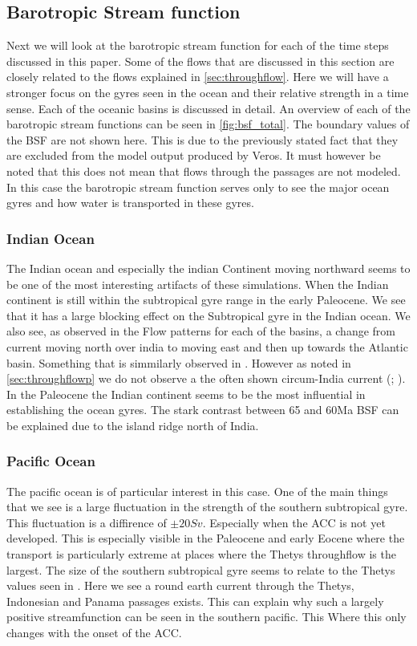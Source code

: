 \subsection{Barotropic Stream function}
\label{sec:BSF}

Next we will look at the barotropic stream function for each of the time steps discussed in this paper. Some of the flows that are discussed in this section are closely related to the flows explained in \cref{sec:throughflow}. Here we will have a stronger focus on the gyres seen in the ocean and their relative strength in a time sense. Each of the oceanic basins is discussed in detail. An overview of each of the barotropic stream functions can be seen in \cref{fig:bsf_total}. The boundary values of the BSF are not shown here. This is due to the previously stated fact that they are excluded from the model output produced by Veros. It must however be noted that this does not mean that flows through the passages are not modeled. In this case the barotropic stream function serves only to see the major ocean gyres and how water is transported in these gyres.

\subsubsection{Indian Ocean}
The Indian ocean and especially the indian Continent moving northward seems to be one of the most interesting artifacts of these simulations. When the Indian continent is still within the subtropical gyre range in the early Paleocene. We see that it has a large blocking effect on the Subtropical gyre in the Indian ocean. We also see, as observed in the Flow patterns for each of the basins, a change from current moving north over india to moving east and then up towards the Atlantic basin. Something that is simmilarly observed in \cite{omta2003physical}. However as noted in \cref{sec:throughflowp} we do not observe a the often shown circum-India current (\cite{omta2003physical};
\cite{von2006effect}). In the Paleocene the Indian continent seems to be the most influential in establishing the ocean gyres. The stark contrast between 65 and 60Ma BSF can be explained due to the island ridge north of India.
\subsubsection{Pacific Ocean}
The pacific ocean is of particular interest in this case. One of the main things that we see is a large fluctuation in the strength of the southern subtropical gyre. This fluctuation is a diffirence of $\pm 20 Sv$.  Especially when the ACC is not yet developed. This is especially visible in the Paleocene and early Eocene where the transport is particularly extreme at places where the Thetys throughflow is the largest. The size of the southern subtropical gyre seems to relate to the Thetys values seen in . Here we see a round earth current through the Thetys, Indonesian and Panama passages exists. This can explain why such a largely positive streamfunction can be seen in the southern pacific. This  Where this only changes with the onset of the ACC.
